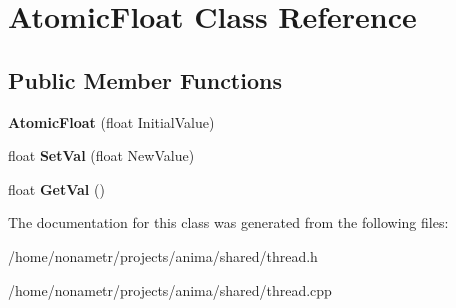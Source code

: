 \hypertarget{classAtomicFloat}{
\section{AtomicFloat Class Reference}
\label{classAtomicFloat}
}
\subsection*{Public Member Functions}
\begin{DoxyCompactItemize}
\item 
\hypertarget{classAtomicFloat_a3b18907aa5d736361d0711bbb53b23b0}{
{\bfseries AtomicFloat} (float InitialValue)}
\label{classAtomicFloat_a3b18907aa5d736361d0711bbb53b23b0}

\item 
\hypertarget{classAtomicFloat_a61b40b6b20e9f0f5d0bbf6944b0ecee0}{
float {\bfseries SetVal} (float NewValue)}
\label{classAtomicFloat_a61b40b6b20e9f0f5d0bbf6944b0ecee0}

\item 
\hypertarget{classAtomicFloat_a7eca4597d95914b0161b5e593dcc3c24}{
float {\bfseries GetVal} ()}
\label{classAtomicFloat_a7eca4597d95914b0161b5e593dcc3c24}

\end{DoxyCompactItemize}


The documentation for this class was generated from the following files:\begin{DoxyCompactItemize}
\item 
/home/nonametr/projects/anima/shared/thread.h\item 
/home/nonametr/projects/anima/shared/thread.cpp\end{DoxyCompactItemize}
